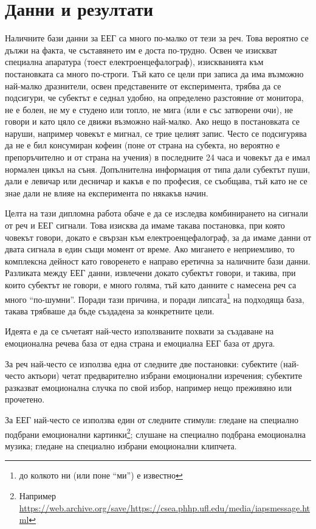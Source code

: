 \documentclass[main.tex]{subfiles}
\begin{document}
\section{Данни и резултати}

Наличните бази данни за ЕЕГ са много по-малко от тези за реч. Това вероятно се дължи на факта, че съставянето им е доста по-трудно. Освен че изискват специална апаратура (тоест електроенцефалограф), изискванията към постановката са много по-строги. Тъй като се цели при записа да има възможно най-малко дразнители, освен представените от експеримента, трябва да се подсигури, че субектът е седнал удобно, на определено разстояние от монитора, не е болен, не му е студено или топло, не мига (или е със затворени очи), не говори и като цяло се движи възможно най-малко. Ако нещо в постановката се наруши, например човекът е мигнал, се трие целият запис. Често се подсигурява да не е бил консумиран кофеин (поне от страна на субекта, но вероятно е препоръчително и от страна на учения) в последните 24 часа и човекът да е имал нормален цикъл на съня. Допълнителна информация от типа дали субектът пуши, дали е левичар или десничар и какъв е по професия, се съобщава, тъй като не се знае дали не влияе на експеримента по някакъв начин. 

Целта на тази дипломна работа обаче е да се изследва комбинирането на сигнали от реч и ЕЕГ сигнали. Това изисква да имаме такава постановка, при която човекът говори, докато е свързан към електроенцефалограф, за да имаме данни от двата сигнала в един същи момент от време. Ако мигането е неприемливо, то комплексна дейност като говоренето е направо еретична за наличните бази данни. Разликата между ЕЕГ данни, извлечени докато субектът говори, и такива, при които субектът не говори, е много голяма, тъй като данните с намесена реч са много ``по-шумни''. Поради тази причина, и поради липсата\footnote{до колкото ни (или поне ``ми'') е известно} на подходяща база, такава трябваше да бъде създадена за конкретните цели.

Идеята е да се съчетаят най-често използваните похвати за създаване на емоционална речева база от една страна и емоциална ЕЕГ база от друга.

За реч най-често се използва една от следните две постановки: субектите (най-често актьори) четат предварително избрани емоционални изречения; субектите разказват емоционална случка по свой избор, например нещо преживяно или прочетено.

За ЕЕГ най-често се използва един от следните стимули: гледане на специално подбрани емоционални картинки\footnote{Например \url{https://web.archive.org/save/https://csea.phhp.ufl.edu/media/iapsmessage.html}}; слушане на специално подбрана емоционална музика; гледане на специално избрани емоционални клипчета.
\end{document}
